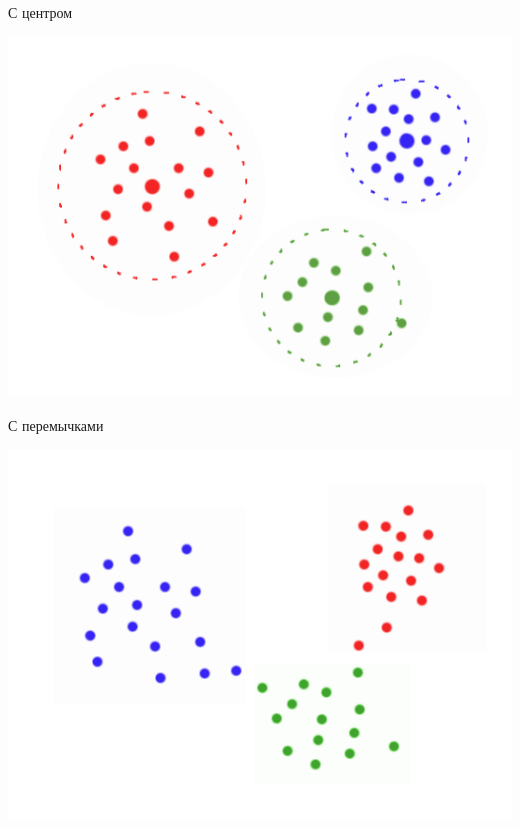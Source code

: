 \documentclass[10pt]{beamer}
\begin{document}
\begin{frame}{С центром}
	\begin{center}
	  \includegraphics[height=0.8 \textheight, keepaspectratio = true]{images/cluster3}  
	\end{center}
\end{frame}

\begin{frame}{С перемычками}
	\begin{center}
	  \includegraphics[height=0.8 \textheight, keepaspectratio = true]{images/cluster4}  
	\end{center}
\end{frame}
\end{document}
